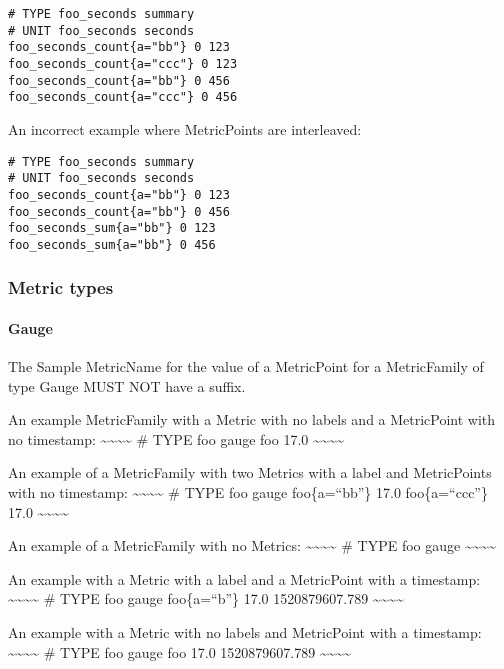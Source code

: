 \documentclass[a4paper,12pt,notitlepage,twoside,openright]{article}
\begin{document}
\begin{verbatim}
# TYPE foo_seconds summary
# UNIT foo_seconds seconds
foo_seconds_count{a="bb"} 0 123
foo_seconds_count{a="ccc"} 0 123
foo_seconds_count{a="bb"} 0 456
foo_seconds_count{a="ccc"} 0 456
\end{verbatim}

An incorrect example where MetricPoints are interleaved:

\begin{verbatim}
# TYPE foo_seconds summary
# UNIT foo_seconds seconds
foo_seconds_count{a="bb"} 0 123
foo_seconds_count{a="bb"} 0 456
foo_seconds_sum{a="bb"} 0 123
foo_seconds_sum{a="bb"} 0 456
\end{verbatim}

\hypertarget{metric-types-1}{%
\subsubsection{Metric types}\label{metric-types-1}}

\hypertarget{gauge-1}{%
\paragraph{Gauge}\label{gauge-1}}

The Sample MetricName for the value of a MetricPoint for a MetricFamily
of type Gauge MUST NOT have a suffix.

An example MetricFamily with a Metric with no labels and a MetricPoint
with no timestamp:
\textasciitilde\textasciitilde\textasciitilde\textasciitilde{} \# TYPE
foo gauge foo 17.0
\textasciitilde\textasciitilde\textasciitilde\textasciitilde{}

An example of a MetricFamily with two Metrics with a label and
MetricPoints with no timestamp:
\textasciitilde\textasciitilde\textasciitilde\textasciitilde{} \# TYPE
foo gauge foo\{a=``bb''\} 17.0 foo\{a=``ccc''\} 17.0
\textasciitilde\textasciitilde\textasciitilde\textasciitilde{}

An example of a MetricFamily with no Metrics:
\textasciitilde\textasciitilde\textasciitilde\textasciitilde{} \# TYPE
foo gauge \textasciitilde\textasciitilde\textasciitilde\textasciitilde{}

An example with a Metric with a label and a MetricPoint with a
timestamp:
\textasciitilde\textasciitilde\textasciitilde\textasciitilde{} \# TYPE
foo gauge foo\{a=``b''\} 17.0 1520879607.789
\textasciitilde\textasciitilde\textasciitilde\textasciitilde{}

An example with a Metric with no labels and MetricPoint with a
timestamp:
\textasciitilde\textasciitilde\textasciitilde\textasciitilde{} \# TYPE
foo gauge foo 17.0 1520879607.789
\textasciitilde\textasciitilde\textasciitilde\textasciitilde{}
\end{document}
